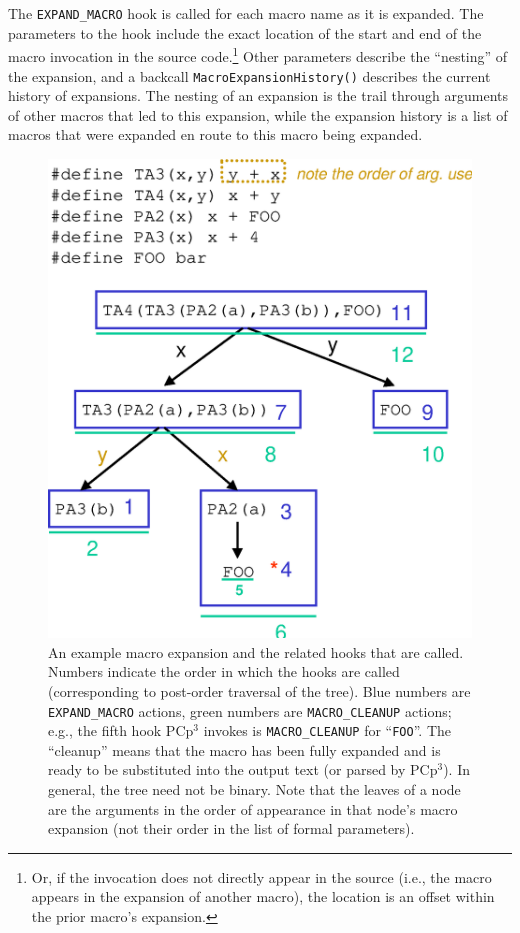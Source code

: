 \documentclass{article}
\newcommand{\pcp}{\mbox{\textsf{PCp}$^3$}}
\newcommand{\ie}{i.e.,}
\newcommand{\eg}{e.g.,}
\begin{document}
\noindent The \texttt{EXPAND\_MACRO} hook is called for each macro name as it is
expanded.  The parameters to the hook include the exact location of the
start and end of the macro invocation in the source code.\footnote{Or,
  if the invocation does not directly appear in the source (\ie{} the
  macro appears in the expansion of another macro), the location is an
  offset within the prior macro's expansion.}  Other parameters
describe the ``nesting'' of the expansion, and a backcall
\texttt{Macro\-Expansion\-History()} describes the current history of
expansions.  The nesting of an expansion is the trail through arguments
of other macros that led to this expansion, while the expansion history
is a list of macros that were expanded en route to this macro being
expanded.

\begin{figure}[p]
  \begin{center}
    \leavevmode
    \includegraphics[width=0.45\linewidth]{figs/tree-expn.eps}
    \caption{An example macro expansion and the related
      hooks that are called. Numbers indicate the order in which the
      hooks are called (corresponding to post-order traversal of the
      tree). Blue numbers are \texttt{EXPAND\_MACRO} actions, green
      numbers are \texttt{MACRO\_CLEANUP} actions; \eg{} the fifth hook
      \pcp{} invokes is \texttt{MACRO\_CLEANUP} for ``\texttt{FOO}''.
      The ``cleanup'' means that the macro has been fully expanded and
      is ready to be substituted into the output text (or parsed by
      \pcp{}). In general, the tree need not be
      binary. Note that the leaves of a node are the arguments in the
      order of appearance in that node's macro expansion (not their
      order in the list of formal parameters).}
    \label{fig:tree-expn}
  \end{center}
\end{figure}
\end{document}

